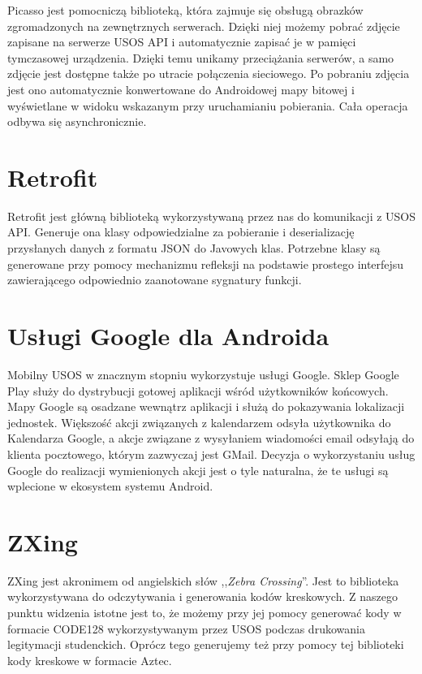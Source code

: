 \documentclass{pracamgr}
\begin{document}
Picasso jest pomocniczą biblioteką, która zajmuje się obsługą obrazków
zgromadzonych na zewnętrznych serwerach. Dzięki niej możemy pobrać
zdjęcie zapisane na serwerze USOS API i automatycznie zapisać je w pamięci
tymczasowej urządzenia. Dzięki temu unikamy przeciążania serwerów, a samo zdjęcie
jest dostępne także po utracie połączenia sieciowego. Po pobraniu zdjęcia
jest ono automatycznie konwertowane do Androidowej mapy bitowej i wyświetlane w
widoku wskazanym przy uruchamianiu pobierania. Cała operacja odbywa się asynchronicznie.

\section{Retrofit}

Retrofit jest główną biblioteką wykorzystywaną przez nas do komunikacji z
USOS API. Generuje ona klasy odpowiedzialne za pobieranie i deserializację
przysłanych danych z formatu JSON do Javowych klas. Potrzebne klasy są generowane
przy pomocy mechanizmu refleksji na podstawie prostego interfejsu zawierającego
odpowiednio zaanotowane sygnatury funkcji.

\section{Usługi Google dla Androida}

Mobilny USOS w znacznym stopniu wykorzystuje usługi Google. Sklep Google Play
służy do dystrybucji gotowej aplikacji wśród użytkowników końcowych. Mapy Google
są osadzane wewnątrz aplikacji i służą do pokazywania lokalizacji jednostek.
Większość akcji związanych z kalendarzem odsyła użytkownika do Kalendarza Google,
a akcje związane z wysyłaniem wiadomości email odsyłają do klienta pocztowego,
którym zazwyczaj jest GMail. Decyzja o wykorzystaniu usług Google do realizacji
wymienionych akcji jest o tyle naturalna, że te usługi są wplecione w ekosystem
systemu Android.

\section{ZXing}

ZXing jest akronimem od angielskich słów ,,\textit{Zebra Crossing}''. Jest to
biblioteka wykorzystywana do odczytywania i generowania kodów kreskowych. Z
naszego punktu widzenia istotne jest to, że możemy przy jej pomocy
generować kody w formacie CODE128 wykorzystywanym przez USOS podczas drukowania
legitymacji studenckich. Oprócz tego generujemy też przy pomocy tej biblioteki
kody kreskowe w formacie Aztec.
\end{document}
